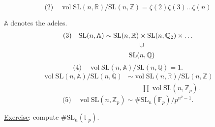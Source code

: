 \[
\text{(2)}\quad
\operatorname{vol}\mathrm{SL}(n,\mathbb R)/\mathrm{SL}(n,\mathbb Z)
=\zeta(2)\zeta(3)\ldots\zeta(n)
\]

\(\mathbb A\) denotes the adeles.
\[
\begin{aligned}
\text{(3)}\quad\mathrm{SL}(n,\mathbb A)&\sim
\mathrm{SL}(n,\mathbb R)\times\mathrm{SL}(n,\mathbb Q_2)\times\ldots\\[-2pt]
 &\hspace{3.6em}\begin{gathered}\cup\\\mathrm{SL}(n,\mathbb Q)\end{gathered}
\end{aligned}
\]
\[
\text{(4)}\quad
\operatorname{vol}\mathrm{SL}(n,\mathbb A)/\mathrm{SL}(n,\mathbb Q)=1.
\]
\[
\begin{aligned}
\operatorname{vol}\mathrm{SL}(n,\mathbb A)/\mathrm{SL}(n,\mathbb Q)
 &\sim
 \operatorname{vol}\mathrm{SL}(n,\mathbb R)/\mathrm{SL}(n,\mathbb Z)\\
 &\qquad \prod\operatorname{vol}\mathrm{SL}(n,\mathbb Z_p).
\end{aligned}
\]
\[
\text{(5)}\quad
\operatorname{vol}\mathrm{SL}(n,\mathbb Z_p)
\sim\#\mathrm{SL}_n(\mathbb F_p)/p^{n^2-1}.
\]

\uline{Exercise}: compute \(\#\mathrm{SL}_n(\mathbb F_p)\).


